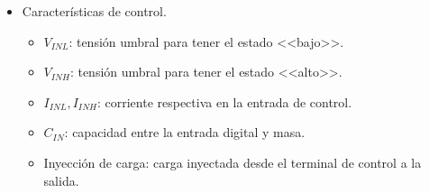 \begin{itemize}
\begin{itemize}
    \end{itemize}
    \item Características de control.
    \begin{itemize}
        \item $V_{INL}$: tensión umbral para tener el estado <<bajo>>.
        \item $V_{INH}$: tensión umbral para tener el estado <<alto>>.
        \item $I_{INL}, I_{INH}$: corriente respectiva en la entrada de control.
        \item $C_{IN}$: capacidad entre la entrada digital y masa.
        \item Inyección de carga: carga inyectada desde el terminal de control a la salida.
    \end{itemize}
\end{itemize}